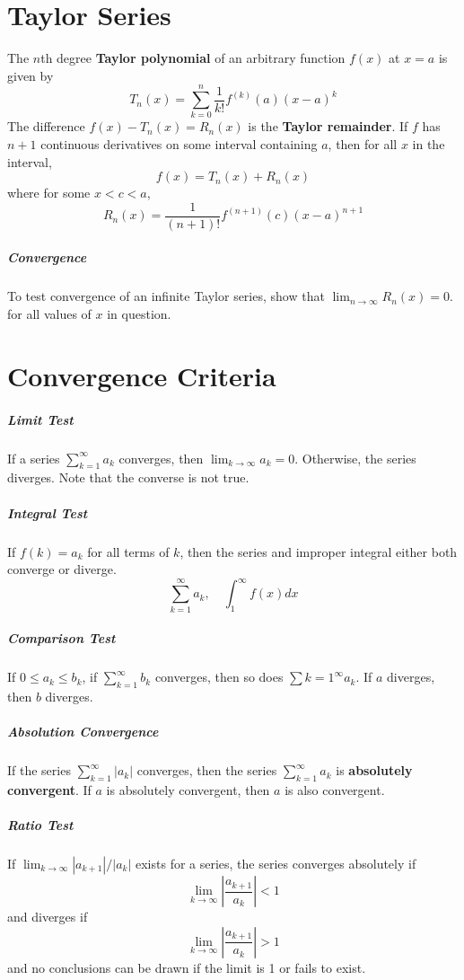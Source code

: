 \documentclass[11pt]{article}
\begin{document}
\section{Taylor Series}
	The $n$th degree \textbf{Taylor polynomial} of an arbitrary function $f(x)$ at $x=a$ is given by
	\begin{equation}
		T_n(x) = \sum_{k=0}^n \frac{1}{k!}f^{(k)}(a)(x-a)^k
	\end{equation}
	The difference $f(x) - T_n(x) = R_n(x)$ is the \textbf{Taylor remainder}. If $f$ has $n+1$ continuous derivatives on some interval containing $a$, then for all $x$ in the interval,
	\begin{equation}
		f(x) = T_n(x) + R_n(x)
	\end{equation}
	where for some $x < c < a$,
	\begin{equation}
		R_n(x) = \frac{1}{(n+1)!}f^{(n+1)}(c)(x-a)^{n+1}
	\end{equation}
	
	\subparagraph{Convergence} To test convergence of an infinite Taylor series, show that $\lim_{n\rightarrow \infty} R_n(x) = 0$. for all values of $x$ in question.
	
\section{Convergence Criteria}
	\subparagraph{Limit Test} If a series $\sum_{k=1}^\infty a_k$ converges, then $\lim_{k\rightarrow \infty} a_k = 0$. Otherwise, the series diverges. Note that the converse is not true.
	
	\subparagraph{Integral Test} If $f(k) = a_k$ for all terms of $k$, then the series and improper integral either both converge or diverge.
	\begin{equation}
		\sum_{k=1}^\infty a_k, \quad \int_1^\infty f(x)dx
	\end{equation}
	
	\subparagraph{Comparison Test} If $0 \leq a_k \leq b_k$, if $\sum_{k=1}^\infty b_k$ converges, then so does $\sum{k=1}^\infty a_k$. If $a$ diverges, then $b$ diverges.
	
	\subparagraph{Absolution Convergence} If the series $\sum_{k=1}^\infty |a_k|$ converges, then the series $\sum_{k=1}^\infty a_k$ is \textbf{absolutely convergent}. If $a$ is absolutely convergent, then $a$ is also convergent.
	
	\subparagraph{Ratio Test} If $\lim_{k\rightarrow \infty} |a_{k+1}|/|a_k|$ exists for a series, the series converges absolutely if
	\begin{equation}
		\lim_{k\rightarrow \infty} \left| \frac{a_{k+1}}{a_k} \right| < 1
	\end{equation}
	and diverges if
	\begin{equation}
		\lim_{k\rightarrow \infty} \left| \frac{a_{k+1}}{a_k} \right| > 1
	\end{equation}
	and no conclusions can be drawn if the limit is 1 or fails to exist.
	
\end{document}
